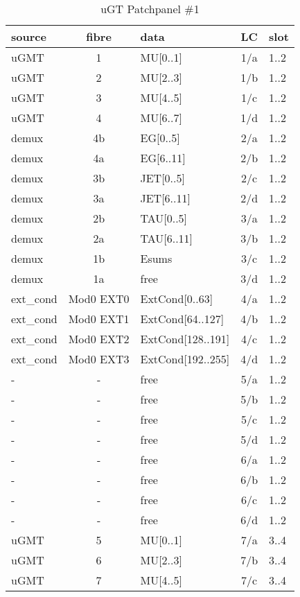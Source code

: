 \begin{longtable}{|l|c|l|c|l|}
\caption{uGT Patchpanel \#1}
    \label{tab:app:ugt_opt_pp_1}\\
\hline
\textbf{source}& \textbf{fibre}& \textbf{data}& \textbf{LC}& \textbf{slot}\\
\hline
\hline
\endhead
uGMT  & 1   & MU[0..1]   & 1/a  & 1..2 \\\hline
uGMT  & 2   & MU[2..3]   & 1/b  & 1..2 \\\hline
uGMT  & 3   & MU[4..5]   & 1/c  & 1..2 \\\hline
uGMT  & 4   & MU[6..7]   & 1/d  & 1..2 \\\hline
demux & 4b  & EG[0..5]   & 2/a  & 1..2 \\\hline
demux & 4a  & EG[6..11]  & 2/b  & 1..2 \\\hline
demux & 3b  & JET[0..5]  & 2/c  & 1..2 \\\hline
demux & 3a  & JET[6..11] & 2/d  & 1..2 \\\hline
demux & 2b  & TAU[0..5]  & 3/a  & 1..2 \\\hline
demux & 2a  & TAU[6..11] & 3/b  & 1..2 \\\hline
demux & 1b  & Esums      & 3/c  & 1..2 \\\hline
demux & 1a  & free       & 3/d  & 1..2 \\\hline
ext\_cond & Mod0 EXT0 & ExtCond[0..63]    & 4/a  & 1..2 \\\hline
ext\_cond & Mod0 EXT1 & ExtCond[64..127]  & 4/b  & 1..2 \\\hline
ext\_cond & Mod0 EXT2 & ExtCond[128..191] & 4/c  & 1..2 \\\hline
ext\_cond & Mod0 EXT3 & ExtCond[192..255] & 4/d  & 1..2 \\\hline
- & - & free & 5/a  & 1..2 \\\hline
- & - & free & 5/b  & 1..2 \\\hline
- & - & free & 5/c  & 1..2 \\\hline
- & - & free & 5/d  & 1..2 \\\hline
- & - & free & 6/a  & 1..2 \\\hline
- & - & free & 6/b  & 1..2 \\\hline
- & - & free & 6/c  & 1..2 \\\hline
- & - & free & 6/d  & 1..2 \\\hline
\hline
uGMT  & 5   & MU[0..1]   & 7/a  & 3..4 \\\hline
uGMT  & 6   & MU[2..3]   & 7/b  & 3..4 \\\hline
uGMT  & 7   & MU[4..5]   & 7/c  & 3..4 \\\hline

\end{longtable}
